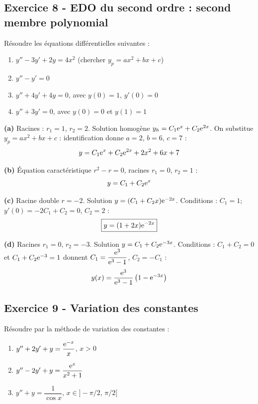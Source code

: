 \documentclass[12pt,a4paper]{article}
\begin{document}
\subsection*{Exercice 8 - EDO du second ordre : second membre polynomial \niveau{\moyen}}

\begin{boiteexercice}
Résoudre les équations différentielles suivantes :
\begin{enumerate}[label=(\alph*)]
  \item $y'' - 3y' + 2y = 4x^2$ (chercher $y_p = ax^2 + bx + c$)
  \item $y'' - y' = 0$
  \item $y'' + 4y' + 4y = 0$, avec $y(0) = 1$, $y'(0) = 0$
  \item $y'' + 3y' = 0$, avec $y(0) = 0$ et $y(1) = 1$
\end{enumerate}
\end{boiteexercice}

\begin{boitecorrige}
\textbf{(a)} Racines : $r_1=1$, $r_2=2$. Solution homogène $y_h = C_1\mathrm{e}^x + C_2\mathrm{e}^{2x}$. On substitue $y_p = ax^2+bx+c$ : identification donne $a=2$, $b=6$, $c=7$ :
\[
y = C_1\mathrm{e}^x + C_2\mathrm{e}^{2x} + 2x^2 + 6x + 7
\]

\textbf{(b)} Équation caractéristique $r^2 - r = 0$, racines $r_1 = 0$, $r_2 = 1$ :
\[
y = C_1 + C_2\mathrm{e}^x
\]

\textbf{(c)} Racine double $r = -2$. Solution $y = (C_1 + C_2 x)\mathrm{e}^{-2x}$. Conditions : $C_1 = 1$; $y'(0) = -2C_1 + C_2 = 0$, $C_2 = 2$ :
\[
\boxed{y = (1+2x)\mathrm{e}^{-2x}}
\]

\textbf{(d)} Racines $r_1 = 0$, $r_2 = -3$. Solution $y = C_1 + C_2\mathrm{e}^{-3x}$. Conditions : $C_1 + C_2 = 0$ et $C_1 + C_2\mathrm{e}^{-3} = 1$ donnent $C_1 = \dfrac{\mathrm{e}^3}{\mathrm{e}^3-1}$, $C_2 = -C_1$ :
\[
y(x) = \frac{\mathrm{e}^3}{\mathrm{e}^3-1}\left(1-\mathrm{e}^{-3x}\right)
\]
\end{boitecorrige}

\subsection*{Exercice 9 - Variation des constantes \niveau{\difficile}}

\begin{boiteexercice}
Résoudre par la méthode de variation des constantes :
\begin{enumerate}[label=(\alph*)]
  \item $y'' + 2y' + y = \dfrac{\mathrm{e}^{-x}}{x}$, $x > 0$
  \item $y'' - 2y' + y = \dfrac{\mathrm{e}^x}{x^2+1}$
  \item $y'' + y = \dfrac{1}{\cos x}$, $x \in ]-\pi/2,\,\pi/2[$
\end{enumerate}
\end{boiteexercice}
\end{document}
